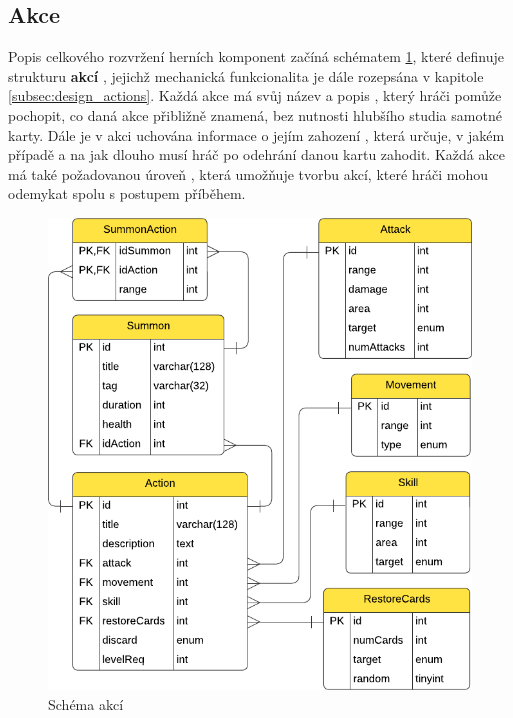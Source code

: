 \subsection{Akce}
\label{subsec:schema_actions}

Popis celkového rozvržení herních komponent začíná schématem \ref{diag:er_action}, které definuje strukturu \textbf{akcí} , jejichž mechanická funkcionalita je dále rozepsána v kapitole \ref{subsec:design_actions}. Každá akce má svůj název  a popis , který hráči pomůže pochopit, co daná akce přibližně znamená, bez nutnosti hlubšího studia samotné karty. Dále je v akci uchována informace o jejím zahození , která určuje, v jakém případě a na jak dlouho musí hráč po odehrání danou kartu zahodit. Každá akce má také požadovanou úroveň , která umožňuje tvorbu akcí, které hráči mohou odemykat spolu s postupem příběhem.

\begin{figure}[h]
    \centering
    \includegraphics{../../shared/diagrams/er_action.pdf}
    \caption{Schéma akcí}
    \label{diag:er_action}
\end{figure}

